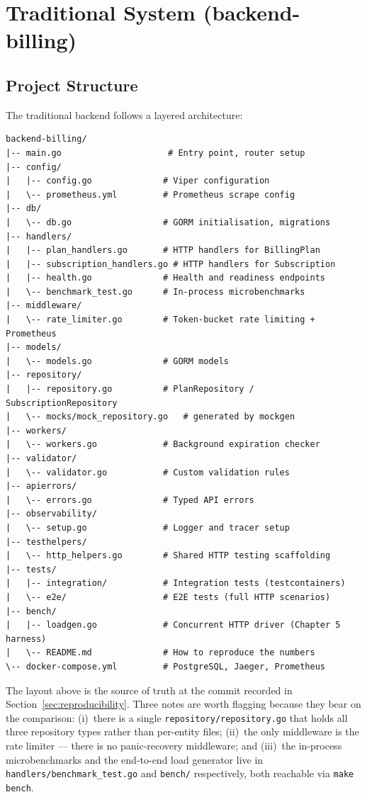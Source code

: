 \section{Traditional System (backend-billing)}

\subsection{Project Structure}

The traditional backend follows a layered architecture:

\begin{lstlisting}[caption={backend-billing project structure}, label={lst:backend-structure}]
backend-billing/
|-- main.go                     # Entry point, router setup
|-- config/
|   |-- config.go              # Viper configuration
|   \-- prometheus.yml         # Prometheus scrape config
|-- db/
|   \-- db.go                  # GORM initialisation, migrations
|-- handlers/
|   |-- plan_handlers.go       # HTTP handlers for BillingPlan
|   |-- subscription_handlers.go # HTTP handlers for Subscription
|   |-- health.go              # Health and readiness endpoints
|   \-- benchmark_test.go      # In-process microbenchmarks
|-- middleware/
|   \-- rate_limiter.go        # Token-bucket rate limiting + Prometheus
|-- models/
|   \-- models.go              # GORM models
|-- repository/
|   |-- repository.go          # PlanRepository / SubscriptionRepository
|   \-- mocks/mock_repository.go   # generated by mockgen
|-- workers/
|   \-- workers.go             # Background expiration checker
|-- validator/
|   \-- validator.go           # Custom validation rules
|-- apierrors/
|   \-- errors.go              # Typed API errors
|-- observability/
|   \-- setup.go               # Logger and tracer setup
|-- testhelpers/
|   \-- http_helpers.go        # Shared HTTP testing scaffolding
|-- tests/
|   |-- integration/           # Integration tests (testcontainers)
|   \-- e2e/                   # E2E tests (full HTTP scenarios)
|-- bench/
|   |-- loadgen.go             # Concurrent HTTP driver (Chapter 5 harness)
|   \-- README.md              # How to reproduce the numbers
\-- docker-compose.yml         # PostgreSQL, Jaeger, Prometheus
\end{lstlisting}

The layout above is the source of truth at the commit recorded in Section~\ref{sec:reproducibility}. Three notes are worth flagging because they bear on the comparison: (i)~there is a single \texttt{repository/repository.go} that holds all three repository types rather than per-entity files; (ii)~the only middleware is the rate limiter --- there is no panic-recovery middleware; and (iii)~the in-process microbenchmarks and the end-to-end load generator live in \texttt{handlers/benchmark\_test.go} and \texttt{bench/} respectively, both reachable via \texttt{make bench}.


